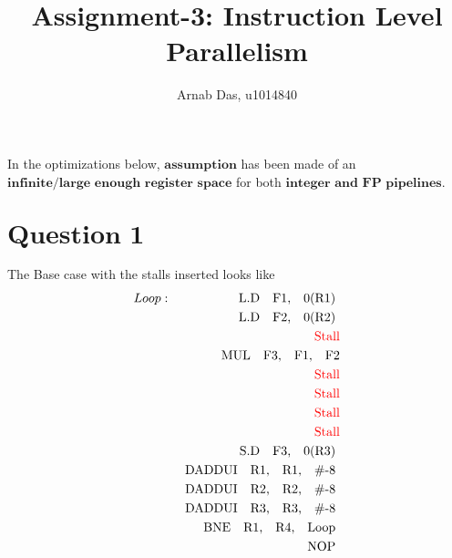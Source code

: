 \documentclass{tufte-handout}
\title{Assignment-3: Instruction Level Parallelism}
\author[]{Arnab Das, u1014840}
\begin{document}
  
  \maketitle%
  

 \setcounter{secnumdepth}{1}

\newpage

	In the optimizations below, $\textbf{assumption}$ has been made of an $\textbf{infinite/large enough register space}$ for both $\textbf{integer and FP pipelines}$.

  \section{$\textbf{Question 1}$}
  	The Base case with the stalls inserted looks like
	\begin{eqnarray*}
		Loop : & & \mbox{ L.D\quad F1,\quad 0(R1) }   \\
		       & & \mbox{ L.D\quad F2,\quad 0(R2) }   \\
		       & & \mbox{ \textcolor{red}{Stall}}   \\
		       & & \mbox{ MUL\quad F3,\quad F1,\quad F2}   \\
		       & & \mbox{ \textcolor{red}{Stall}}   \\
		       & & \mbox{ \textcolor{red}{Stall}}   \\
		       & & \mbox{ \textcolor{red}{Stall}}   \\
		       & & \mbox{ \textcolor{red}{Stall}}   \\
		       & & \mbox{ S.D\quad F3,\quad 0(R3) }   \\
		       & & \mbox{ DADDUI\quad R1,\quad R1,\quad \#-8 }   \\
		       & & \mbox{ DADDUI\quad R2,\quad R2,\quad \#-8 }   \\
		       & & \mbox{ DADDUI\quad R3,\quad R3,\quad \#-8 }   \\
		       & & \mbox{ BNE\quad R1,\quad R4,\quad Loop }   \\
		       & & \mbox{ NOP }   \\
	\end{eqnarray*}
\end{document}
